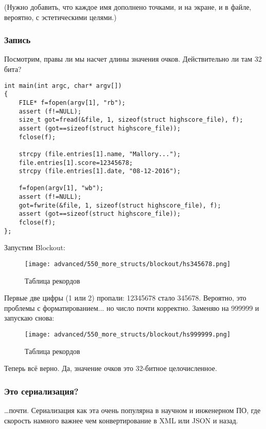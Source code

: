 (Нужно добавить, что каждое имя дополнено точками, и на экране, и в файле, вероятно, с эстетическими целями.)

\subsubsection{Запись}

Посмотрим, правы ли мы насчет длины значения очков. Действительно ли там 32 бита?

\begin{lstlisting}[style=customc]
int main(int argc, char* argv[])
{
	FILE* f=fopen(argv[1], "rb");
	assert (f!=NULL);
	size_t got=fread(&file, 1, sizeof(struct highscore_file), f);
	assert (got==sizeof(struct highscore_file));
	fclose(f);

	strcpy (file.entries[1].name, "Mallory...");
	file.entries[1].score=12345678;
	strcpy (file.entries[1].date, "08-12-2016");

	f=fopen(argv[1], "wb");
	assert (f!=NULL);
	got=fwrite(&file, 1, sizeof(struct highscore_file), f);
	assert (got==sizeof(struct highscore_file));
	fclose(f);
};
\end{lstlisting}

Запустим Blockout:

\begin{figure}[H]
\centering
\texttt{[image: advanced/550\_more\_structs/blockout/hs345678.png]}
\caption{Таблица рекордов}
\end{figure}

Первые две цифры (1 или 2) пропали: 12345678 стало 345678. Вероятно, это проблемы с форматированием... но число почти корректно.
Заменяю на 999999 и запускаю снова:

\begin{figure}[H]
\centering
\texttt{[image: advanced/550\_more\_structs/blockout/hs999999.png]}
\caption{Таблица рекордов}
\end{figure}

Теперь всё верно. Да, значение очков это 32-битное целочисленное.

\subsubsection{Это сериализация?}

\dots почти.
Сериализация как эта очень популярна в научном и инженерном ПО, где скорость намного важнее чем конвертирование в
\ac{XML} или \ac{JSON} и назад.

